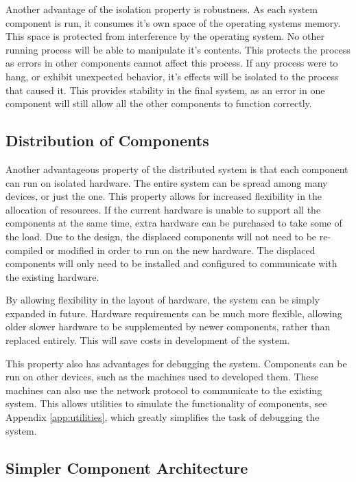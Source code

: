 Another advantage of the isolation property is robustness. As each system component is run, it consumes it's own space of the operating systems memory. This space is protected from interference by the operating system. No other running process will be able to manipulate it's contents. This protects the process as errors in other components cannot affect this process. If any process were to hang, or exhibit unexpected behavior, it's effects will be isolated to the process that caused it. This provides stability in the final system, as an error in one component will still allow all the other components to function correctly.

\subsection{Distribution of Components}

Another advantageous property of the distributed system is that each component can run on isolated hardware. The entire system can be spread among many devices, or just the one. This property allows for increased flexibility in the allocation of resources. If the current hardware is unable to support all the components at the same time, extra hardware can be purchased to take some of the load. Due to the design, the displaced components will not need to be re-compiled or modified in order to run on the new hardware. The displaced components will only need to be installed and configured to communicate with the existing hardware. 

By allowing flexibility in the layout of hardware, the system can be simply expanded in future. Hardware requirements can be much more flexible, allowing older slower hardware to be supplemented by newer components, rather than replaced entirely. This will save costs in development of the system.

This property also has advantages for debugging the system. Components can be run on other devices, such as the machines used to developed them. These machines can also use the network protocol to communicate to the existing system. This allows utilities to simulate the functionality of components, see Appendix \ref{app:utilities}, which greatly simplifies the task of debugging the system.

\subsection{Simpler Component Architecture}

